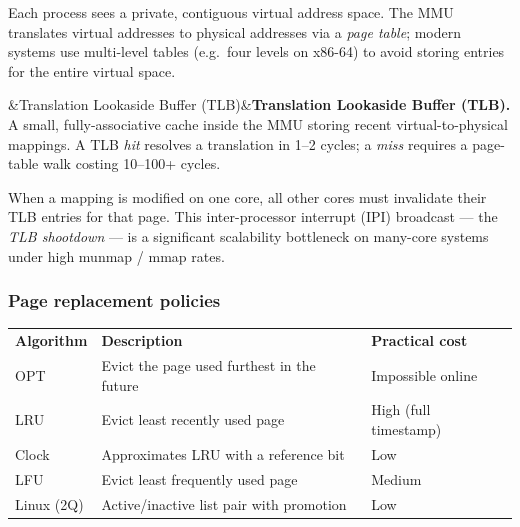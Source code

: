 \documentclass[12pt,a4paper]{article}
\newcommand{\ic}[1]{%
  \mbox{\colorbox{AnthCodeBG}{\footnotesize\ttfamily\textcolor{AnthBlue}{#1}}}%
}
\newenvironment{Warn}[1][Warning]{%
  \begin{tcolorbox}[warnbox, title=#1]}{\end{tcolorbox}}
\newenvironment{Def}[1][]{%
  \begin{tcolorbox}[defbox]\ifx&#1&\else\textbf{#1.}\enspace\fi}{\end{tcolorbox}}
\begin{document}
Each process sees a private, contiguous virtual address space. The MMU translates
virtual addresses to physical addresses via a \emph{page table}; modern systems use
multi-level tables (e.g.\ four levels on x86-64) to avoid storing entries for the
entire virtual space.

\begin{Def}[Translation Lookaside Buffer (TLB)]
  A small, fully-associative cache inside the MMU storing recent virtual-to-physical
  mappings. A TLB \emph{hit} resolves a translation in 1–2 cycles; a \emph{miss}
  requires a page-table walk costing 10–100+ cycles.
\end{Def}

\begin{Warn}[TLB shootdowns in SMP]
  When a mapping is modified on one core, all other cores must invalidate their
  TLB entries for that page. This inter-processor interrupt (IPI) broadcast —
  the \emph{TLB shootdown} — is a significant scalability bottleneck on
  many-core systems under high \ic{munmap}/\ic{mmap} rates.
\end{Warn}

\subsubsection{Page replacement policies}

\begin{center}
\begin{tabularx}{\linewidth}{L{2.4cm} X L{2.8cm}}
  \color{white}\textbf{Algorithm} &
  \color{white}\textbf{Description} &
  \color{white}\textbf{Practical cost} \\
  OPT       & Evict the page used furthest in the future & Impossible online \\
  LRU       & Evict least recently used page & High (full timestamp) \\
  Clock     & Approximates LRU with a reference bit      & Low \\
  LFU       & Evict least frequently used page           & Medium \\
  Linux (2Q)& Active/inactive list pair with promotion   & Low \\
\end{tabularx}
\end{center}

\end{document}
